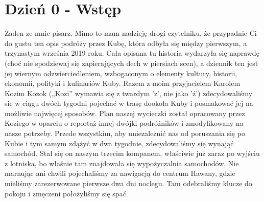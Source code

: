 \chapter[Wstęp]{Dzień 0 - Wstęp}
Żaden ze mnie pisarz.
Mimo to mam nadzieję drogi czytelniku, że przypadnie Ci do gustu ten opis podróży przez Kubę, która odbyła się między pierwszym, a trzynastym września 2019 roku.
Cała opisana tu historia wydarzyła się naprawdę (choć nie spodziewaj się zapierających dech w piersiach scen), a dziennik ten jest jej wiernym odzwierciedleniem, wzbogaconym o elementy kultury, historii, ekonomii, polityki i kulinariów Kuby.
Razem z moim przyjacielem Karolem Kozim Kozok („Kozi” wymawia się z twardym ’z’, nie jako ’ź’) zdecydowaliśmy się w ciągu dwóch tygodni pojechać w trasę dookoła Kuby i posmakować jej na możliwie najwięcej sposobów.
Plan naszej wycieczki został opracowany przez Koziego w oparciu o reportaż innej dwójki podróżników i zmodyfikowany na nasze potrzeby.
Przede wszystkim, aby uniezależnić nas od poruszania się po Kubie i tym samym zdążyć w dwa tygodnie, zdecydowaliśmy się wynająć samochód. Stał się on naszym trzecim kompanem, właściwie już zaraz po wyjściu z lotniska, bo właśnie tam znajdowała się wypożyczalnia samochodów.
Nie marnując ani chwili pojechaliśmy za nawigacją do centrum Hawany, gdzie mieliśmy zarezerwowane pierwsze dwa dni noclegu.
Tam odebraliśmy klucze do pokoju i zmęczeni położyliśmy się spać.